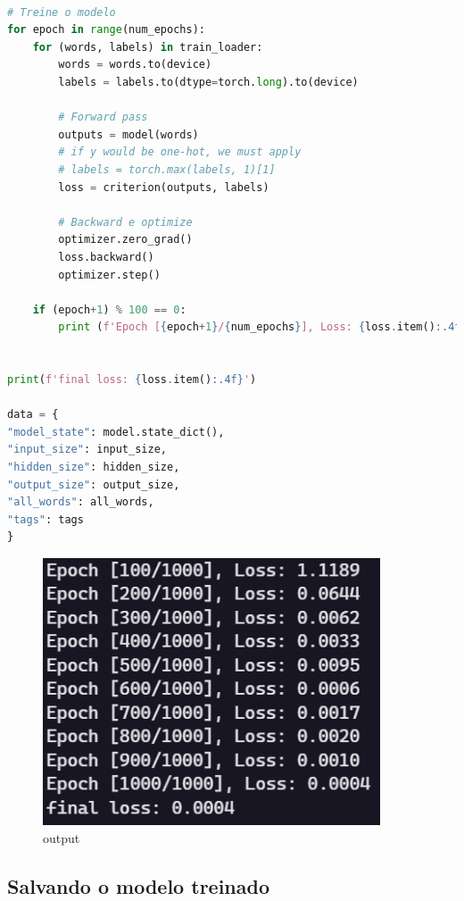 \begin{lstlisting}[language=Python, caption=Treinando o Modelo]

# Treine o modelo
for epoch in range(num_epochs):
    for (words, labels) in train_loader:
        words = words.to(device)
        labels = labels.to(dtype=torch.long).to(device)

        # Forward pass
        outputs = model(words)
        # if y would be one-hot, we must apply
        # labels = torch.max(labels, 1)[1]
        loss = criterion(outputs, labels)

        # Backward e optimize
        optimizer.zero_grad()
        loss.backward()
        optimizer.step()

    if (epoch+1) % 100 == 0:
        print (f'Epoch [{epoch+1}/{num_epochs}], Loss: {loss.item():.4f}')


print(f'final loss: {loss.item():.4f}')

data = {
"model_state": model.state_dict(),
"input_size": input_size,
"hidden_size": hidden_size,
"output_size": output_size,
"all_words": all_words,
"tags": tags
}


\end{lstlisting}

\begin{figure}[H]
   \begin{center}
      \includegraphics[width=10cm]{img/treinando.png}
      \caption{output} \label{tmode}
   \end{center}
\end{figure}


\subsection[Salvando o modelo treinado]{Salvando o modelo treinado}

